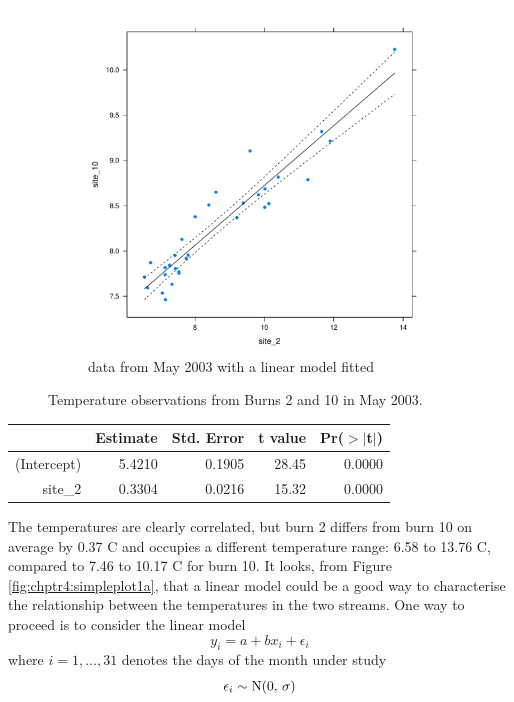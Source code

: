 \begin{figure}
\begin{subfigure}[b]{0.45\textwidth}
    \includegraphics[width=\textwidth]{simpleExampleplot-2}
    \caption{data from May 2003 with a linear model fitted}
    \label{fig:chptr4:simpleplot1b}
  \end{subfigure}
\caption{Temperature observations from Burns 2 and 10 in May 2003.}
\label{fig:chptr4:simpleplot1}
\end{figure}

\begin{table}[ht]
\centering
\begin{tabular}{rrrrr}
  \hline
 & Estimate & Std. Error & t value & Pr($>$$|$t$|$) \\ 
  \hline
(Intercept) & 5.4210 & 0.1905 & 28.45 & 0.0000 \\ 
  site\_2 & 0.3304 & 0.0216 & 15.32 & 0.0000 \\ 
   \hline
\end{tabular}
\end{table}

The temperatures are clearly correlated, but burn 2 differs from burn 10 on average by 0.37 \degrees C and occupies a different temperature range: 6.58 to 13.76 \degrees C, compared to 7.46 to 10.17 \degrees C for burn 10. It looks, from Figure \ref{fig:chptr4:simpleplot1a}, that a linear model could be a good way to characterise the relationship between the temperatures in the two streams. One way to proceed is to consider the linear model 
\begin{equation}
  y_i = a + b x_i + \epsilon_i
\end{equation}
where $i = 1, \ldots, 31$ denotes the days of the month under study
\begin{equation}
  \epsilon_i \sim \operatorname{N}(0,\, \sigma)
\end{equation}

